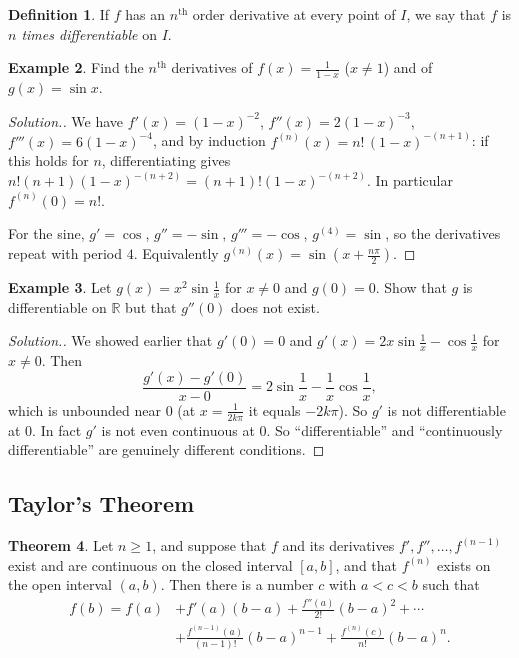 \documentclass[11pt,a4paper]{article}
\numberwithin{equation}{section}
\theoremstyle{definition}
\newtheorem{thm}{Theorem}[subsection]
\newtheorem{defn}[thm]{Definition}
\newtheorem{exa}[thm]{Example}
\newenvironment{solution}
  {\renewcommand{\qedsymbol}{}\begin{proof}[\textit{Solution}.]}
  {\end{proof}}
\begin{document}
\begin{defn}
If $f$ has an $n^{\text{th}}$ order derivative at every point of $I$, we say that $f$ is \emph{$n$ times differentiable} on $I$.
\end{defn}

\begin{exa}
Find the $n^{\text{th}}$ derivatives of $f(x) = \frac{1}{1-x}$ ($x\neq1$) and of $g(x) = \sin x$.
\end{exa}

\begin{solution}
We have $f'(x) = (1-x)^{-2}$, $f''(x) = 2(1-x)^{-3}$, $f'''(x) = 6(1-x)^{-4}$, and by induction $f^{(n)}(x) = n!\,(1-x)^{-(n+1)}$: if this holds for $n$, differentiating gives $n!(n+1)(1-x)^{-(n+2)} = (n+1)!(1-x)^{-(n+2)}$. In particular $f^{(n)}(0) = n!$.

For the sine, $g' = \cos$, $g'' = -\sin$, $g''' = -\cos$, $g^{(4)} = \sin$, so the derivatives repeat with period $4$. Equivalently $g^{(n)}(x) = \sin\left(x + \frac{n\pi}{2}\right)$.
\end{solution}

\begin{exa}
Let $g(x) = x^2\sin\frac{1}{x}$ for $x\neq0$ and $g(0) = 0$. Show that $g$ is differentiable on $\mathbb{R}$ but that $g''(0)$ does not exist.
\end{exa}

\begin{solution}
We showed earlier that $g'(0) = 0$ and $g'(x) = 2x\sin\frac{1}{x} - \cos\frac{1}{x}$ for $x\neq0$. Then
$$\frac{g'(x) - g'(0)}{x - 0} = 2\sin\frac{1}{x} - \frac{1}{x}\cos\frac{1}{x},$$
which is unbounded near $0$ (at $x = \frac{1}{2k\pi}$ it equals $-2k\pi$). So $g'$ is not differentiable at $0$. In fact $g'$ is not even continuous at $0$. So ``differentiable'' and ``continuously differentiable'' are genuinely different conditions.
\end{solution}


\subsection{Taylor's Theorem}

\begin{thm}
Let $n\geq1$, and suppose that $f$ and its derivatives $f', f'', \dots, f^{(n-1)}$ exist and are continuous on the closed interval $[a,b]$, and that $f^{(n)}$ exists on the open interval $(a,b)$. Then there is a number $c$ with $a < c< b$ such that
\begin{align*}
f(b) = f(a) &+ f'(a) (b-a) + \frac{f''(a)}{2!} (b - a)^2 + \cdots \\
&+ \frac{f^{(n-1)}(a)}{(n - 1)!} (b - a)^{n - 1} + \frac{f^{(n)}(c)}{n!} (b - a)^n .
\end{align*}
\end{thm}
\end{document}
